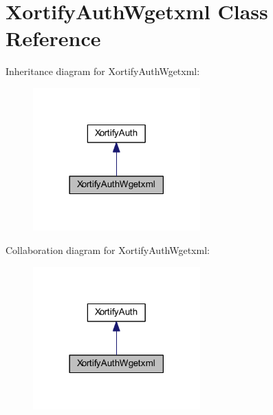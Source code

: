 \hypertarget{class_xortify_auth_wgetxml}{\section{Xortify\-Auth\-Wgetxml Class Reference}
\label{class_xortify_auth_wgetxml}
}


Inheritance diagram for Xortify\-Auth\-Wgetxml\-:
\nopagebreak
\begin{figure}[H]
\begin{center}
\leavevmode
\includegraphics[width=182pt]{class_xortify_auth_wgetxml__inherit__graph}
\end{center}
\end{figure}


Collaboration diagram for Xortify\-Auth\-Wgetxml\-:
\nopagebreak
\begin{figure}[H]
\begin{center}
\leavevmode
\includegraphics[width=182pt]{class_xortify_auth_wgetxml__coll__graph}
\end{center}
\end{figure}
